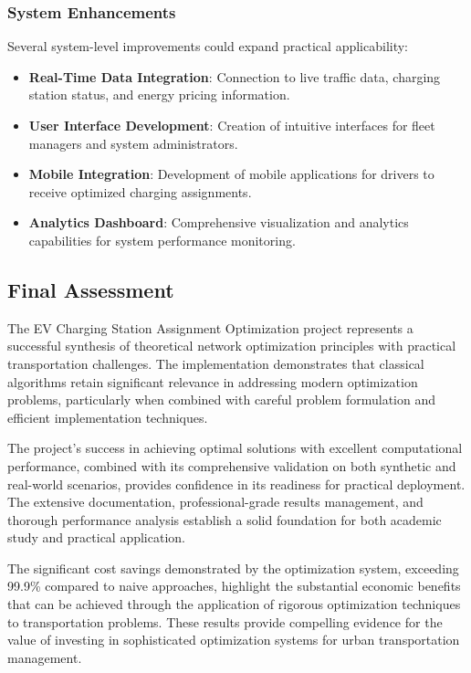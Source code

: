 \documentclass[12pt,a4paper]{article}
\begin{document}
\subsubsection{System Enhancements}

Several system-level improvements could expand practical applicability:

\begin{itemize}
\item \textbf{Real-Time Data Integration}: Connection to live traffic data, charging station status, and energy pricing information.
\item \textbf{User Interface Development}: Creation of intuitive interfaces for fleet managers and system administrators.
\item \textbf{Mobile Integration}: Development of mobile applications for drivers to receive optimized charging assignments.
\item \textbf{Analytics Dashboard}: Comprehensive visualization and analytics capabilities for system performance monitoring.
\end{itemize}

\subsection{Final Assessment}

The EV Charging Station Assignment Optimization project represents a successful synthesis of theoretical network optimization principles with practical transportation challenges. The implementation demonstrates that classical algorithms retain significant relevance in addressing modern optimization problems, particularly when combined with careful problem formulation and efficient implementation techniques.

The project's success in achieving optimal solutions with excellent computational performance, combined with its comprehensive validation on both synthetic and real-world scenarios, provides confidence in its readiness for practical deployment. The extensive documentation, professional-grade results management, and thorough performance analysis establish a solid foundation for both academic study and practical application.

The significant cost savings demonstrated by the optimization system, exceeding 99.9\% compared to naive approaches, highlight the substantial economic benefits that can be achieved through the application of rigorous optimization techniques to transportation problems. These results provide compelling evidence for the value of investing in sophisticated optimization systems for urban transportation management.
\end{document}
